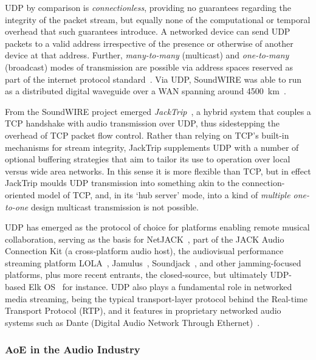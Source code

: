 \documentclass[utf8]{FrontiersinHarvard}
\begin{document}
    UDP by comparison is \textit{connectionless}, providing no guarantees
    regarding the integrity of the packet stream, but equally none of the
    computational or temporal overhead that such guarantees introduce.
    A networked device can send UDP packets to a valid address irrespective of
    the presence or otherwise of another device at that address.
    Further, \textit{many-to-many} (multicast) and \textit{one-to-many}
    (broadcast) modes of transmission are possible via address spaces reserved
    as part of the internet protocol standard~\citep{meyer_iana_2010}.
    Via UDP, SoundWIRE was able to run as a distributed digital waveguide over a
    WAN spanning around \qty{4500}{\km}~\citep{chafe_simplified_2000}.

    From the SoundWIRE project emerged \textit{JackTrip}~\citep{
        caceres_jacktrip_2010,caceres_jacktripsoundwire_2010}, a hybrid system
    that couples a TCP handshake with audio transmission over UDP, thus
    sidestepping the overhead of TCP packet flow control.
    Rather than relying on TCP's built-in mechanisms for stream integrity,
    JackTrip supplements UDP with a number of optional buffering strategies that
    aim to tailor its use to operation over local versus wide area networks.
    In this sense it is more flexible than TCP, but in effect JackTrip moulds
    UDP transmission into something akin to the connection-oriented model of
    TCP, and, in its `hub server' mode, into a kind of
    \textit{multiple one-to-one} design \textemdash{} multicast transmission is
    not possible.

    UDP has emerged as the protocol of choice for platforms enabling remote
    musical collaboration, serving as the basis for
    NetJACK~\citep{carot_netjack_2009}, part of the JACK Audio Connection Kit (a
    cross-platform audio host), the audiovisual performance streaming platform
    LOLA~\citep{drioli_networked_2013}, Jamulus~\citep{fischer_case_2015},
    Soundjack~\citep{renaud_networked_2007}, and other jamming-focused
    platforms, plus more recent entrants, the closed-source, but ultimately
    UDP-based Elk OS~\citep{turchet_elk_2021} for instance.
    UDP also plays a fundamental role in networked media streaming, being the
    typical transport-layer protocol behind the Real-time Transport Protocol
    (RTP), and it features in proprietary networked audio systems such as Dante
    (Digital Audio Network Through Ethernet)~\citep{dante_what_2022}.

    \subsubsection{AoE in the Audio Industry}
\end{document}
